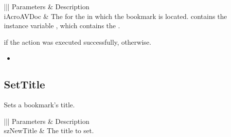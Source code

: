 \documentclass[letterpaper,12pt,english,openany,oneside]{sphinxmanual}
\begin{document}
\begin{savenotes}\sphinxattablestart
\centering
{}\label{\detokenize{IAC_API_OLE_Objects:section-54}}\nobreak
\begin{tabular}[t]{|||}
\hline
\sphinxstyletheadfamily 
Parameters
&\sphinxstyletheadfamily 
Description
\\
\hline
iAcroAVDoc
&
The  for the  in which the bookmark is located.  contains the instance variable , which contains the .
\\
\hline
\end{tabular}
\par
\sphinxattableend\end{savenotes}


 if the action was executed successfully,  otherwise.

\label{\detokenize{IAC_API_OLE_Objects:related-methods-86}}
\begin{itemize}
\item {} 
 

\end{itemize}




\subsection{SetTitle}
\label{\detokenize{IAC_API_OLE_Objects:settitle-2}}\label{\detokenize{IAC_API_OLE_Objects:id15}}
Sets a bookmark’s title.


\begin{sphinxVerbatim}[commandchars=\\\{\}]
  
\end{sphinxVerbatim}
\label{\detokenize{IAC_API_OLE_Objects:parameters-49}}


\begin{savenotes}\sphinxattablestart
\centering
{}\label{\detokenize{IAC_API_OLE_Objects:section-55}}\nobreak
\begin{tabular}[t]{|||}
\hline
\sphinxstyletheadfamily 
Parameters
&\sphinxstyletheadfamily 
Description
\\
\hline
szNewTitle
&
The title to set.
\\
\hline
\end{tabular}
\par
\sphinxattableend\end{savenotes}
\end{document}
